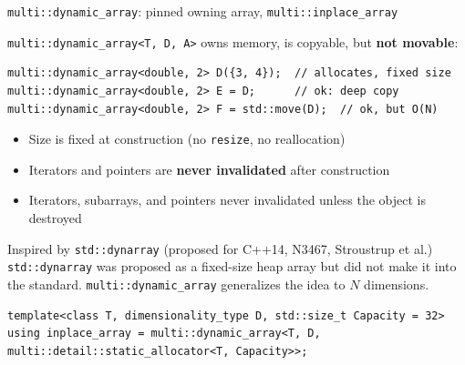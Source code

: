 \begin{frame}[fragile]{\texttt{multi::dynamic\_array}: pinned owning array, \texttt{multi::inplace\_array}}

\lstinline|multi::dynamic_array<T, D, A>| owns memory, is copyable, but \textbf{not movable}:

\begin{lstlisting}
multi::dynamic_array<double, 2> D({3, 4});  // allocates, fixed size
multi::dynamic_array<double, 2> E = D;      // ok: deep copy
multi::dynamic_array<double, 2> F = std::move(D);  // ok, but O(N)
\end{lstlisting}

\begin{itemize}
  \item Size is fixed at construction (no \lstinline|resize|, no reallocation)
  \item Iterators and pointers are \textbf{never invalidated} after construction
  \item Iterators, subarrays, and pointers never invalidated unless the object is destroyed
\end{itemize}

\begin{block}{Inspired by \texttt{std::dynarray} (proposed for C++14, N3467, Stroustrup et al.)}
  \texttt{std::dynarray} was proposed as a fixed-size heap array
  but did not make it into the standard.
  \texttt{multi::dynamic\_array} generalizes the idea to $N$ dimensions.
\end{block}

\begin{lstlisting}
template<class T, dimensionality_type D, std::size_t Capacity = 32>
using inplace_array = multi::dynamic_array<T, D, multi::detail::static_allocator<T, Capacity>>;
\end{lstlisting}

\end{frame}

